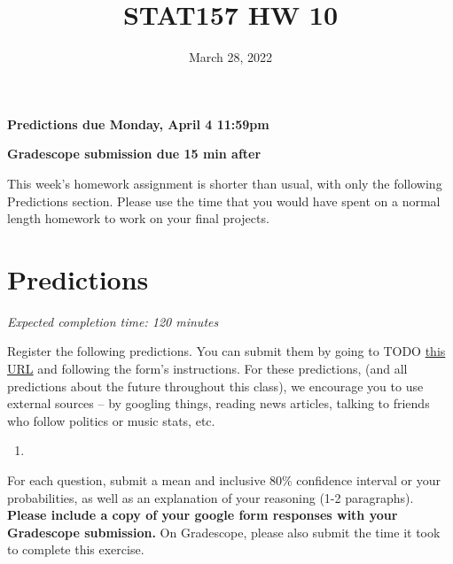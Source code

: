 \documentclass[11pt]{article}
\title{STAT157 HW 10}
\date{March 28, 2022}
\begin{document}
\maketitle

\hfill \textbf{Predictions due Monday, April 4 11:59pm}

\hfill \textbf{Gradescope submission due 15 min after}


This week's homework assignment is shorter than usual, with only the following Predictions section. Please use the time that you would have spent on a normal length homework to work on your final projects.


\section*{Predictions}

\emph{Expected completion time: 120 minutes}

Register the following predictions. You can submit them by going to TODO \href{TODO}{this URL} and following the form's instructions. For these predictions, (and all predictions about the future throughout this class), we encourage you to use external sources -- by googling things, reading news articles, talking to friends who follow politics or music stats, etc.

\begin{enumerate}
	\item 
\end{enumerate}

For each question, submit a mean and inclusive 80\% confidence interval or your probabilities, as well as an explanation of your reasoning (1-2 paragraphs). \textbf{Please include a copy of your google form responses with your Gradescope submission.} On Gradescope, please also submit the time it took to complete this exercise.
\end{document}
